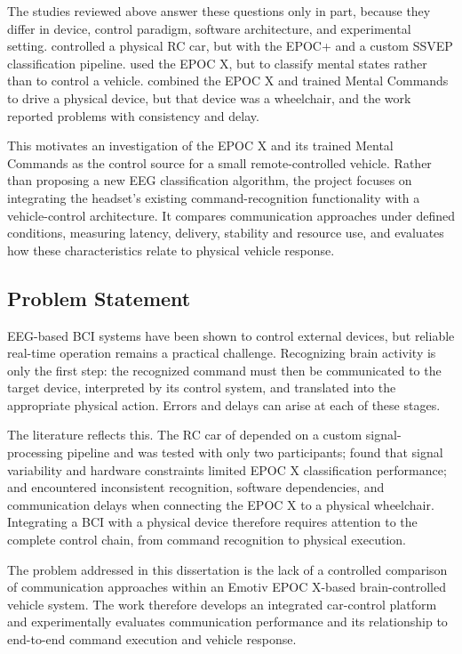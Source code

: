 The studies reviewed above answer these questions only in part, because they differ in device, control paradigm, software architecture, and experimental setting. \citet{setiono2018rccar} controlled a physical RC car, but with the EPOC+ and a custom SSVEP classification pipeline. \citet{tarara2025} used the EPOC X, but to classify mental states rather than to control a vehicle. \citet{stoyell2022wheelchair} combined the EPOC X and trained Mental Commands to drive a physical device, but that device was a wheelchair, and the work reported problems with consistency and delay.

This motivates an investigation of the EPOC X and its trained Mental Commands as the control source for a small remote-controlled vehicle. Rather than proposing a new EEG classification algorithm, the project focuses on integrating the headset's existing command-recognition functionality with a vehicle-control architecture. It compares communication approaches under defined conditions, measuring latency, delivery, stability and resource use, and evaluates how these characteristics relate to physical vehicle response.

\subsection{Problem Statement}

EEG-based BCI systems have been shown to control external devices, but reliable real-time operation remains a practical challenge. Recognizing brain activity is only the first step: the recognized command must then be communicated to the target device, interpreted by its control system, and translated into the appropriate physical action. Errors and delays can arise at each of these stages.

The literature reflects this. The RC car of \citet{setiono2018rccar} depended on a custom signal-processing pipeline and was tested with only two participants; \citet{tarara2025} found that signal variability and hardware constraints limited EPOC X classification performance; and \citet{stoyell2022wheelchair} encountered inconsistent recognition, software dependencies, and communication delays when connecting the EPOC X to a physical wheelchair. Integrating a BCI with a physical device therefore requires attention to the complete control chain, from command recognition to physical execution.

The problem addressed in this dissertation is the lack of a controlled comparison of communication approaches within an Emotiv EPOC X-based brain-controlled vehicle system. The work therefore develops an integrated car-control platform and experimentally evaluates communication performance and its relationship to end-to-end command execution and vehicle response.

